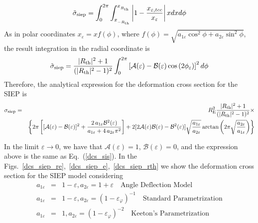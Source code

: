 \begin{equation}
\tilde{\sigma}_{\rm siep}= \int_{0}^{2\pi}\int_{x_{_{-R_{\rm th}}}}^{x_{_{R_{\rm th}}}}\left| 1-\dfrac{x_{\varepsilon,tcc}}{x_{\varepsilon}}\right| x dx d\phi 
\end{equation}
As in polar coordinates $x_{\varepsilon}=xf(\phi)$, where $f(\phi)=\sqrt{a_{1\varepsilon}\cos^2{\phi}+a_{2\varepsilon}\sin^2{\phi}}$, the result integration in the radial coordinate is
\begin{equation}
\tilde{\sigma}_{\rm siep}= \dfrac{|R_{\rm th}|^2+1}{(|R_{\rm th}|^2-1)^2}
\int_{0}^{2\pi}\left[\mathcal{A}(\varepsilon)-\mathcal{B}(\varepsilon)\cos{
(2\phi_\varepsilon)} \right]^2 d\phi 
\end{equation}
Therefore, the analytical expression for the deformation cross section for the SIEP is
\begin{eqnarray}
\sigma_{\rm siep}&=& R^2_{\rm E}\dfrac{|R_{\rm th}|^2+1}{(|R_{\rm th}|^2-1)^2}\times \nonumber \\
& & \left\{2\pi\left[ [\mathcal{A}(\varepsilon)-\mathcal{B}(\varepsilon)]^2+\frac{2\,a_{1\varepsilon}\mathcal{B}^2(\varepsilon)}{a_{1\varepsilon}+4\,a_{2\varepsilon}\pi^{2}} \right]+ 2[2\mathcal{A}(\varepsilon)\mathcal{B}(\varepsilon)-\mathcal{B}^2(\varepsilon)]\sqrt{\frac{a_{1\varepsilon}}{a_{2\varepsilon}}}\arctan{\left( 2\pi\sqrt{\frac{a_{2\varepsilon}}{a_{1\varepsilon}}}\right)} \right\} \nonumber \\
\end{eqnarray}

In the limit $\varepsilon \rightarrow 0$, we have that $\mathcal{A}(\varepsilon)=1$, $\mathcal{B}(\varepsilon)=0$,  and the expression above is the same as Eq.~(\ref{dcs_sis}). In the Figs.~\ref{dcs_siep_re},~\ref{dcs_siep_e},~\ref{dcs_siep_rth} we show the deformation cross section for the SIEP model considering 
\begin{eqnarray}
 a_{1\varepsilon}&=&1-\varepsilon, a_{2\varepsilon}=1+\varepsilon \quad
\textrm{Angle Deflection Model} \\ 
a_{1\varepsilon} &=&1-\varepsilon,a_{2\varepsilon}=(1-\varepsilon_\varphi)^{-1} 
\quad
\textrm{Standard Parametrization} \\
a_{1\varepsilon} &=& 1, a_{2\varepsilon}=(1-\varepsilon_\varphi)^{-2}
\quad
\textrm{Keeton's Parametrization} 
\end{eqnarray}



